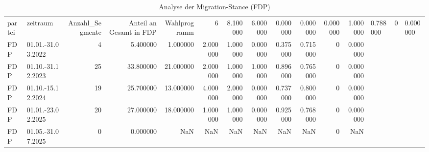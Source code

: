 \begin{table}
\caption{Analyse der Migration-Stance (FDP)}
\label{tab:meine_tabelle}
\begin{tabular}{llrrrrrrrrrr}
\toprule
partei & zeitraum & Anzahl_Segmente & Anteil an Gesamt in %
\midrule
FDP & Wahlprogramm & 6 & 8.100000 & 6.000000 & 0.000000 & 0.000000 & 0.000000 & 1.000000 & 0.788000 & 0 & 0.000000 \\
FDP & 01.01.-31.03.2022 & 4 & 5.400000 & 1.000000 & 2.000000 & 1.000000 & 0.000000 & 0.375000 & 0.715000 & 0 & 0.000000 \\
FDP & 01.10.-31.12.2023 & 25 & 33.800000 & 21.000000 & 2.000000 & 1.000000 & 1.000000 & 0.896000 & 0.765000 & 0 & 0.000000 \\
FDP & 01.10.-15.12.2024 & 19 & 25.700000 & 13.000000 & 4.000000 & 2.000000 & 0.000000 & 0.737000 & 0.800000 & 0 & 0.000000 \\
FDP & 01.01.-23.02.2025 & 20 & 27.000000 & 18.000000 & 1.000000 & 1.000000 & 0.000000 & 0.925000 & 0.768000 & 0 & 0.000000 \\
FDP & 01.05.-31.07.2025 & 0 & 0.000000 & NaN & NaN & NaN & NaN & NaN & NaN & 0 & NaN \\
\bottomrule
\end{tabular}
\end{table}
